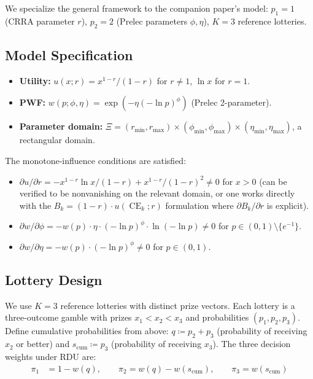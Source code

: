 \documentclass[11pt,a4paper]{article}
\theoremstyle{definition}
\DeclareMathOperator{\CE}{CE}
\begin{document}
We specialize the general framework to the companion paper's model:
$p_1 = 1$ (CRRA parameter $r$), $p_2 = 2$ (Prelec parameters $\phi, \eta$),
$K = 3$ reference lotteries.

\subsection{Model Specification}

\begin{itemize}
    \item \textbf{Utility:} $u(x; r) = x^{1-r} / (1-r)$ for $r \neq 1$,
    $\ln x$ for $r = 1$.

    \item \textbf{PWF:} $w(p; \phi, \eta) = \exp(-\eta(-\ln p)^\phi)$
    (Prelec 2-parameter).

    \item \textbf{Parameter domain:}
    $\Xi = (r_{\min}, r_{\max}) \times (\phi_{\min}, \phi_{\max})
    \times (\eta_{\min}, \eta_{\max})$, a rectangular domain.
\end{itemize}

The monotone-influence conditions are satisfied:
\begin{itemize}
    \item $\partial u / \partial r = -x^{1-r} \ln x / (1-r)
    + x^{1-r} / (1-r)^2 \neq 0$ for $x > 0$ (can be verified to be
    nonvanishing on the relevant domain, or one works directly with
    the $B_k = (1-r) \cdot u(\CE_k; r)$ formulation where
    $\partial B_k / \partial r$ is explicit).

    \item $\partial w / \partial \phi =
    -w(p) \cdot \eta \cdot (-\ln p)^\phi \cdot \ln(-\ln p) \neq 0$ for
    $p \in (0, 1) \setminus \{e^{-1}\}$.

    \item $\partial w / \partial \eta =
    -w(p) \cdot (-\ln p)^\phi \neq 0$ for $p \in (0, 1)$.
\end{itemize}

\subsection{Lottery Design}
\label{sec:lottery_design}

We use $K = 3$ reference lotteries with distinct prize vectors.
Each lottery is a three-outcome gamble with prizes $x_1 < x_2 < x_3$
and probabilities $(p_1, p_2, p_3)$.
Define cumulative probabilities from above:
$q \coloneqq p_2 + p_3$ (probability of receiving $x_2$ or better)
and $s_{\mathrm{cum}} \coloneqq p_3$ (probability of receiving $x_3$).
The three decision weights under RDU are:
\begin{align}
    \pi_1 &= 1 - w(q), \qquad
    \pi_2 = w(q) - w(s_{\mathrm{cum}}), \qquad
    \pi_3 = w(s_{\mathrm{cum}})
\end{align}
\end{document}
